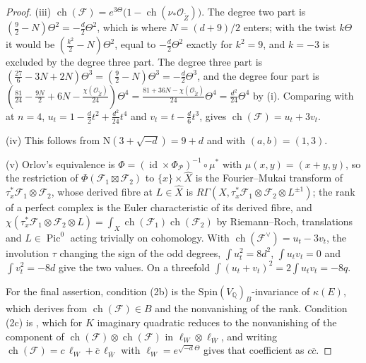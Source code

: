 \documentclass[11pt,reqno]{amsart}
\theoremstyle{plain}
\theoremstyle{definition}
\theoremstyle{remark}
\newcommand{\QQ}{\mathbb{Q}}
\newcommand{\cP}{\mathcal{P}}
\newcommand{\cF}{\mathcal{F}}
\newcommand{\cO}{\mathcal{O}}
\newcommand{\Nm}{\mathrm{N}}             %
\DeclareMathOperator{\ch}{ch}
\DeclareMathOperator{\Pic}{Pic}
\DeclareMathOperator{\id}{id}
\newcommand{\bbar}[1]{\overline{#1}}
\begin{document}
\begin{proof}
(iii) $\ch(\cF)=e^{3\Theta}\bigl(1-\ch(\nu_{*}\cO_{\widetilde Z})\bigr)$. The
degree two part is $(\tfrac92-N)\Theta^{2}=-\tfrac d2\Theta^{2}$, which is
where $N=(d+9)/2$ enters; with the twist $k\Theta$ it would be
$(\tfrac{k^{2}}{2}-N)\Theta^{2}$, equal to $-\tfrac d2\Theta^{2}$ exactly for
$k^{2}=9$, and $k=-3$ is excluded by the degree three part. The degree three
part is $(\tfrac{27}{6}-3N+2N)\Theta^{3}=(\tfrac92-N)\Theta^{3}=-\tfrac d2\Theta^{3}$,
and the degree four part is
$(\tfrac{81}{24}-\tfrac{9N}{2}+6N-\tfrac{\chi(\cO_{\widetilde Z})}{24})\Theta^{4}
=\tfrac{81+36N-\chi(\cO_{\widetilde Z})}{24}\Theta^{4}=\tfrac{d^{2}}{24}\Theta^{4}$
by (i). Comparing with \cite[(30)]{paperI} at $n=4$,
$u_{t}=1-\tfrac d2t^{2}+\tfrac{d^{2}}{24}t^{4}$ and $v_{t}=t-\tfrac d6t^{3}$,
gives $\ch(\cF)=u_{t}+3v_{t}$.

(iv) This follows from $\Nm(3+\sqrt{-d})=9+d$ and \cite[(31)]{paperI} with
$(a,b)=(1,3)$.

(v) Orlov's equivalence is $\Phi=(\id\times\Phi_{\cP})^{-1}\circ\mu^{*}$ with
$\mu(x,y)=(x+y,y)$, so the restriction of $\Phi(\cF_{1}\boxtimes\cF_{2})$ to
$\{x\}\times\widehat X$ is the Fourier--Mukai transform of
$\tau_{x}^{*}\cF_{1}\otimes\cF_{2}$, whose derived fibre at $L\in\widehat X$
is $R\Gamma(X,\tau_{x}^{*}\cF_{1}\otimes\cF_{2}\otimes L^{\pm1})$; the rank
of a perfect complex is the Euler characteristic of its derived fibre, and
$\chi(\tau_{x}^{*}\cF_{1}\otimes\cF_{2}\otimes L)=\int_{X}\ch(\cF_{1})\ch(\cF_{2})$
by Riemann--Roch, translations and $L\in\Pic^{0}$ acting trivially on
cohomology. With $\ch(\cF^{\vee})=u_{t}-3v_{t}$, the involution $\tau$
changing the sign of the odd degrees, $\int u_{t}^{2}=8d^{2}$,
$\int u_{t}v_{t}=0$ and $\int v_{t}^{2}=-8d$ give the two values. On a
threefold $\int(u_{t}+v_{t})^{2}=2\int u_{t}v_{t}=-8q$.

For the final assertion, condition (2b) is the
$\mathrm{Spin}(V_{\QQ})_{B}$-invariance of $\kappa(E)$, which
\cite[Corollary 9.2]{Mar25b} derives from $\ch(\cF)\in B$ and the
nonvanishing of the rank. Condition (2c) is
\cite[Proposition 10.2]{Mar25b}, which for $K$ imaginary quadratic reduces
to the nonvanishing of the component of $\ch(\cF)\otimes\ch(\cF)$ in
$\ell_{W}\otimes\ell_{\bbar W}$, and writing $\ch(\cF)=c\,\ell_{W}+\bbar c\,\ell_{\bbar W}$
with $\ell_{W}=e^{\sqrt{-d}\Theta}$ gives that coefficient as $c\bbar c$.
\end{proof}
\end{document}
